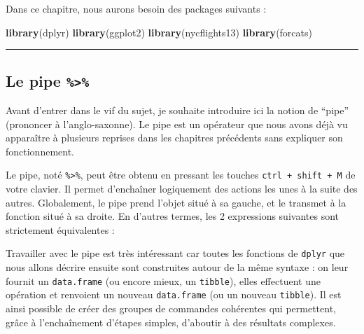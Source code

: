 \documentclass[a4paperpaper,]{article}
\newenvironment{Shaded}{\begin{snugshade}}{\end{snugshade}}
\newcommand{\CommentTok}[1]{\textcolor[rgb]{0.54,0.53,0.53}{#1}}
\newcommand{\KeywordTok}[1]{\textcolor[rgb]{0.12,0.11,0.11}{\textbf{#1}}}
\newcommand{\NormalTok}[1]{\textcolor[rgb]{0.12,0.11,0.11}{#1}}
\newcommand{\OperatorTok}[1]{\textcolor[rgb]{0.12,0.11,0.11}{#1}}
\newcommand{\StringTok}[1]{\textcolor[rgb]{0.75,0.01,0.01}{#1}}
\theoremstyle{definition}
\theoremstyle{definition}
\theoremstyle{definition}
\theoremstyle{remark}
\begin{document}
Dans ce chapitre, nous aurons besoin des packages suivants :

\begin{Shaded}
\begin{Highlighting}[]
\KeywordTok{library}\NormalTok{(dplyr)}
\KeywordTok{library}\NormalTok{(ggplot2)}
\KeywordTok{library}\NormalTok{(nycflights13)}
\KeywordTok{library}\NormalTok{(forcats)}
\end{Highlighting}
\end{Shaded}

\begin{center}\rule{0.5\linewidth}{\linethickness}\end{center}

\hypertarget{le-pipe}{%
\subsection{\texorpdfstring{Le pipe
\texttt{\%\textgreater{}\%}}{Le pipe \%\textgreater{}\%}}\label{le-pipe}}

Avant d'entrer dans le vif du sujet, je souhaite introduire ici la
notion de ``pipe'' (prononcer à l'anglo-saxonne). Le pipe est un
opérateur que nous avons déjà vu apparaître à plusieurs reprises dans
les chapitres précédents sans expliquer son fonctionnement.

Le pipe, noté \texttt{\%\textgreater{}\%}, peut être obtenu en pressant
les touches \texttt{ctrl\ +\ shift\ +\ M} de votre clavier. Il permet
d'enchaîner logiquement des actions les unes à la suite des autres.
Globalement, le pipe prend l'objet situé à sa gauche, et le transmet à
la fonction situé à sa droite. En d'autres termes, les 2 expressions
suivantes sont strictement équivalentes :

\begin{Shaded}
\end{Shaded}

Travailler avec le pipe est très intéressant car toutes les fonctions de
\texttt{dplyr} que nous allons décrire ensuite sont construites autour
de la même syntaxe : on leur fournit un \texttt{data.frame} (ou encore
mieux, un \texttt{tibble}), elles effectuent une opération et renvoient
un nouveau \texttt{data.frame} (ou un nouveau \texttt{tibble}). Il est
ainsi possible de créer des groupes de commandes cohérentes qui
permettent, grâce à l'enchaînement d'étapes simples, d'aboutir à des
résultats complexes.
\end{document}
